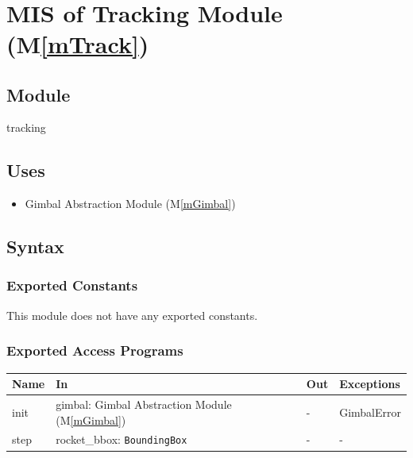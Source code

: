 \documentclass[12pt, titlepage]{article}
\newcommand{\mref}[1]{M\ref{#1}}
\begin{document}
\ \

\section{MIS of Tracking Module (\mref{mTrack})}

\subsection{Module}

tracking

\subsection{Uses}

\begin{itemize}
  \item Gimbal Abstraction Module (\mref{mGimbal})
\end{itemize}

\subsection{Syntax}

\subsubsection{Exported Constants}

This module does not have any exported constants.

\subsubsection{Exported Access Programs}

\begin{center}
  \begin{tabular}{p{3cm} p{6cm} p{2cm} p{3.5cm}}
    \hline
    \textbf{Name} & \textbf{In}                                        & \textbf{Out} & \textbf{Exceptions} \\
    \hline
    init          & gimbal: Gimbal Abstraction Module (\mref{mGimbal}) & -            & GimbalError         \\
    \hline
    step          & rocket\_bbox: \texttt{BoundingBox}                 & -            & -                   \\
    \hline
  \end{tabular}
\end{center}
\end{document}
